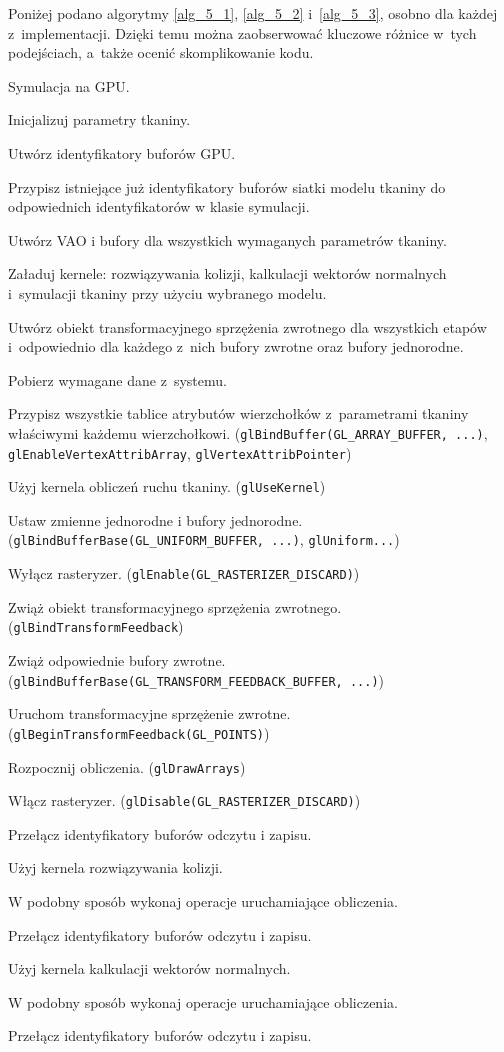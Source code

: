 		Poniżej podano algorytmy \ref{alg_5_1}, \ref{alg_5_2} i~\ref{alg_5_3}, osobno dla każdej z~implementacji. Dzięki temu można zaobserwować kluczowe różnice w~tych podejściach, a~także ocenić skomplikowanie kodu.
		\newpage
		\begin{algorithm}[H]
			\label{alg_5_1}
			\caption{Symulacja na GPU.}	
			
			Inicjalizuj parametry tkaniny.
			
			Utwórz identyfikatory buforów GPU.
			
			Przypisz istniejące już identyfikatory buforów siatki modelu tkaniny do odpowiednich identyfikatorów w klasie symulacji.
			
			Utwórz VAO i bufory dla wszystkich wymaganych parametrów tkaniny.
			
			Załaduj kernele: rozwiązywania kolizji, kalkulacji wektorów normalnych i~symulacji tkaniny przy użyciu wybranego modelu.
			
			Utwórz obiekt transformacyjnego sprzężenia zwrotnego dla wszystkich etapów i~odpowiednio dla każdego z~nich bufory zwrotne oraz bufory jednorodne.

			{
				Pobierz wymagane dane z~systemu. 
				
				Przypisz wszystkie tablice atrybutów wierzchołków z~parametrami tkaniny właściwymi każdemu wierzchołkowi. (\texttt{glBindBuffer(GL\_ARRAY\_BUFFER, ...)}, \texttt{glEnableVertexAttribArray}, \texttt{glVertexAttribPointer})
				
				Użyj kernela obliczeń ruchu tkaniny. (\texttt{glUseKernel})
				
				Ustaw zmienne jednorodne i bufory jednorodne. (\texttt{glBindBufferBase(GL\_UNIFORM\_BUFFER, ...)}, \texttt{glUniform...})
				
				Wyłącz rasteryzer. (\texttt{glEnable(GL\_RASTERIZER\_DISCARD)})
				
				Zwiąż obiekt transformacyjnego sprzężenia zwrotnego. (\texttt{glBindTransformFeedback})
				
				Zwiąż odpowiednie bufory zwrotne. (\texttt{glBindBufferBase(GL\_TRANSFORM\_FEEDBACK\_BUFFER, ...)})
				
				Uruchom transformacyjne sprzężenie zwrotne. (\texttt{glBeginTransformFeedback(GL\_POINTS)})
				
				Rozpocznij obliczenia. (\texttt{glDrawArrays})
				
				Włącz rasteryzer. (\texttt{glDisable(GL\_RASTERIZER\_DISCARD)})
				
				Przełącz identyfikatory buforów odczytu i zapisu.
				
				Użyj kernela rozwiązywania kolizji.
				
				W podobny sposób wykonaj operacje uruchamiające obliczenia.
				
				Przełącz identyfikatory buforów odczytu i zapisu.
				
				Użyj kernela kalkulacji wektorów normalnych.
				
				W podobny sposób wykonaj operacje uruchamiające obliczenia.
				
				Przełącz identyfikatory buforów odczytu i zapisu.
			}
		\end{algorithm}
